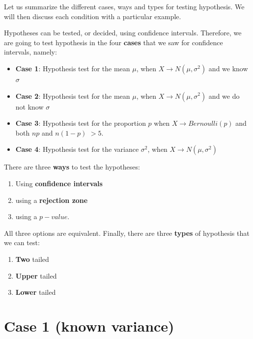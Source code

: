 \documentclass[
]{book}
\providecommand{\tightlist}{%
  \setlength{\itemsep}{0pt}\setlength{\parskip}{0pt}}
\begin{document}
Let us summarize the different cases, ways and types for testing hypothesis. We will then discuss each condition with a particular example.

Hypotheses can be tested, or decided, using confidence intervals. Therefore, we are going to test hypothesis in the four \textbf{cases} that we saw for confidence intervals, namely:

\begin{itemize}
\item
  \textbf{Case 1}: Hypothesis test for the mean \(\mu\), when \(X \rightarrow N(\mu, \sigma^2)\) and we know \(\sigma\)
\item
  \textbf{Case 2}: Hypothesis test for the mean \(\mu\), when \(X \rightarrow N(\mu, \sigma^2)\) and we do not know \(\sigma\)
\item
  \textbf{Case 3}: Hypothesis test for the proportion \(p\) when \(X \rightarrow Bernoulli(p)\) and both \(np\) and \(n(1-p)\) \(> 5\).
\item
  \textbf{Case 4}: Hypothesis test for the variance \(\sigma^2\), when \(X \rightarrow N(\mu, \sigma^2)\)
\end{itemize}

There are three \textbf{ways} to test the hypotheses:

\begin{enumerate}
\def\labelenumi{\arabic{enumi}.}
\tightlist
\item
  Using \textbf{confidence intervals}
\item
  using a \textbf{rejection zone}
\item
  using a \(p-value\).
\end{enumerate}

All three options are equivalent. Finally, there are three \textbf{types} of hypothesis that we can test:

\begin{enumerate}
\def\labelenumi{\arabic{enumi}.}
\tightlist
\item
  \textbf{Two} tailed
\item
  \textbf{Upper} tailed
\item
  \textbf{Lower} tailed
\end{enumerate}

\hypertarget{case-1-known-variance-1}{%
\section{Case 1 (known variance)}\label{case-1-known-variance-1}}
\end{document}

